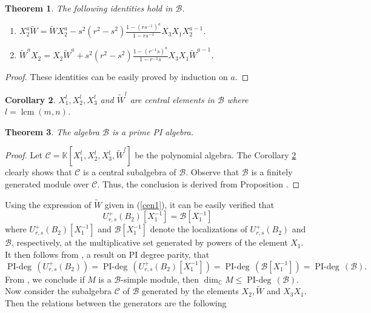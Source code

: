 \documentclass[12 pt,reqno]{amsart}
\numberwithin{equation}{section}
\newcommand{\C}{\mathbb{C}}
\newcommand{\B}{\mathcal{B}}
\DeclareMathOperator{\pideg}{PI-deg}
\DeclareMathOperator{\dime}{dim}
\newtheorem{thm}{Theorem}[section]
\newtheorem{cor}[thm]{Corollary}
\theoremstyle{definition}
\theoremstyle{definition}
\theoremstyle{remark}
\theoremstyle{remark}
\begin{document}
\begin{thm}
    The following identities hold in $\mathcal{B}$.
    \begin{enumerate}[label= \((\arabic*)\)]
        \item $X_2^a\tilde{W}=\tilde{W}X_2^a-s^2(r^2-s^2)\displaystyle\frac{1-(rs^{-1})^{a}}{1-rs^{-1}}X_3X_1X_2^{a-1}$.
        \item $\tilde{W}^aX_2=X_2\tilde{W}^a+s^2(r^2-s^2)\displaystyle\frac{1-(r^{-1}s)^{a}}{1-r^{-1}s}X_3X_1\tilde{W}^{a-1}$.
    \end{enumerate}
\end{thm}
\begin{proof}
    These identities can be easily proved by induction on $a$.
\end{proof}
\begin{cor}\label{cen2}
  $X_1^l, X_2^l, X_3^l$ and $\tilde{W}^l$ are central elements in $\B$ where $l=\operatorname{lcm}(m,n)$.  
\end{cor}
\begin{thm}
   The algebra $\mathcal{B}$ is a prime PI algebra.
\end{thm}
\begin{proof}
    Let $\mathscr{C}= \mathbb{K}[X_1^l,X_2^l, X_3^l, \tilde{W}^l]$ be the polynomial algebra. The Corollary \ref{cen2} clearly shows that $\mathscr{C}$ is a central subalgebra of $\mathcal{B}$. Observe that $\mathcal{B}$ is a finitely generated module over $\mathscr{C}$. Thus, the conclusion is derived from Proposition \cite[Corollary 13.1.13]{mcr}.
\end{proof}
Using the expression of $\tilde{W}$ given in (\ref{cen1}), it can be easily verified that
\begin{equation}\label{sameloc}
    U_{r,s}^+(B_2)[X_1^{-1}]=\mathcal{B}[X_1^{-1}]
\end{equation} where $U_{r,s}^+(B_2)[X_1^{-1}]$ and $\mathcal{B}[X_1^{-1}]$ denote the localizations of $U_{r,s}^+(B_2)$ and $\mathcal{B}$, respectively, at the multiplicative set generated by powers of the element $X_1$. It then follows from \cite[Corollary I.13.3]{brg}, a result on PI degree parity, that 
\[\pideg \,\left(U_{r,s}^+(B_2)\right)=\pideg \,\left(U_{r,s}^+(B_2)[X_1^{-1}]\right)=\pideg \,\left(\mathcal{B}[X_1^{-1}]\right)=\pideg \,\left(\mathcal{B}\right).\]
From \cite[Theorem I.13.5]{brg}, we conclude if $M$ is a $\mathcal{B}$-simple module, then $\dime_{\C}M \leq \pideg\,(\mathcal{B})$.\\
Now consider the subalgebra $\mathcal{C}$ of $\B$ generated by the elements $X_2, \tilde{W}$ and $X_3X_1$. Then the relations between the generators are the following
\end{document}
